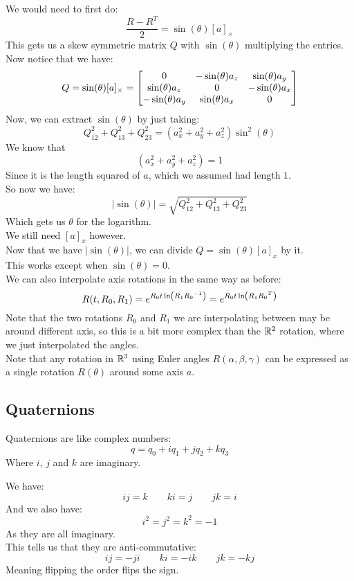 \documentclass[12pt]{article}
\begin{document}
We would need to first do:
\[ \dfrac{R - R^T}{2} = \sin(\theta)[a]_\times \]
This gets us a skew symmetric matrix $Q$
with $\sin(\theta)$ multiplying the entries.
Now notice that we have:
\[ Q = \sin(\theta)[a]_\times
= \begin{bmatrix} 0 & -\sin(\theta)a_z & \sin(\theta)a_y \\ \sin(\theta)a_z & 0 & -\sin(\theta)a_x \\ -\sin(\theta)a_y & \sin(\theta)a_x & 0 \end{bmatrix}\]
Now, we can extract $\sin(\theta)$
by just taking:
\[ Q_{12}^2 + Q_{13}^2 + Q_{23}^2
= (a_x^2 + a_y^2 + a_z^2)\sin^2(\theta) \]
We know that
\[(a_x^2 + a_y^2 + a_z^2) = 1\]
Since it is the length squared of $a$,
which we assumed had length $1$. \\
So now we have:
\[ |\sin(\theta)| 
= \sqrt{Q_{12}^2 + Q_{13}^2 + Q_{23}^2} \]
Which gets us $\theta$ for the logarithm. \\

We still need $[a]_x$ however. \\
Now that we have $|\sin(\theta)|$,
we can divide $Q = \sin(\theta)[a]_x$
by it. \\
This works except when $\sin(\theta) = 0$. \\

We can also interpolate axis rotations
in the same way as before:
\[ R(t,R_0,R_1) = 
e^{{R_0t\ln\left( {R_1}{R_0}^{-1} \right)}}
= e^{{R_0t\ln\left( {R_1}{R_0}^T \right)}} \]
Note that the two rotations $R_0$
and $R_1$ we are
interpolating between may be around different
axis, so this is a bit more complex than the $\mathbb{R}^2$
rotation, where we just interpolated
the angles. \\

Note that any rotation in $\mathbb{R}^3$
using Euler angles
$R(\alpha, \beta, \gamma)$
can be expressed as a single rotation
$R(\theta)$ around some axis $a$. \\

\newpage

\subsection*{Quaternions}

Quaternions are like complex numbers:
\[ q = q_0 + iq_1 + jq_2 + kq_3 \]
Where $i$, $j$ and $k$ are imaginary.

We have:
\[ ij = k \qquad ki = j \qquad jk = i \]
And we also have:
\[ i^2 = j^2 = k^2 = -1 \]
As they are all imaginary. \\

This tells us that they are anti-commutative:
\[ ij = -ji \qquad ki = -ik \qquad jk = -kj \]
Meaning flipping the order flips the sign. \\
\end{document}
